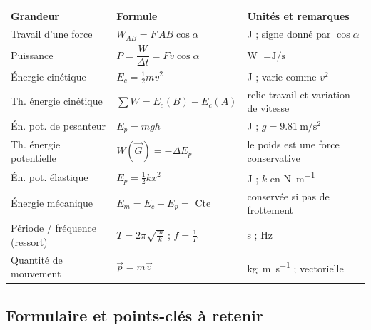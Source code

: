 \documentclass[11pt,a4paper]{article}
\newcommand{\vv}[1]{\vec{#1}}
\begin{document}
\renewcommand{\arraystretch}{1.5}
\begin{center}
\begin{tabular}{>{\raggedright\arraybackslash}m{3.5cm} >{\centering\arraybackslash}m{5.0cm} >{\raggedright\arraybackslash}m{5.2cm}}
\toprule
\rowcolor{primary!15}
\textbf{Grandeur} & \textbf{Formule} & \textbf{Unités et remarques} \\
\midrule
Travail d'une force & $W_{AB}=F\,AB\cos\alpha$ & \si{\joule} ; signe donné par $\cos\alpha$ \\
\rowcolor{black!4}
Puissance & $P=\dfrac{W}{\Delta t}=F v\cos\alpha$ & \si{\watt} $=\si{\joule\per\second}$ \\
Énergie cinétique & $E_c=\tfrac12 m v^2$ & \si{\joule} ; varie comme $v^2$ \\
\rowcolor{black!4}
Th. énergie cinétique & $\sum W=E_c(B)-E_c(A)$ & relie travail et variation de vitesse \\
Én. pot. de pesanteur & $E_p=mgh$ & \si{\joule} ; $g=\SI{9,81}{\metre\per\second\squared}$ \\
\rowcolor{black!4}
Th. énergie potentielle & $W(\vv G)=-\Delta E_p$ & le poids est une force conservative \\
Én. pot. élastique & $E_p=\tfrac12 k x^2$ & \si{\joule} ; $k$ en \si{\newton\per\metre} \\
\rowcolor{black!4}
Énergie mécanique & $E_m=E_c+E_p=$ Cte & conservée si pas de frottement \\
Période / fréquence (ressort) & $T=2\pi\sqrt{\tfrac{m}{k}}$ ; $f=\tfrac1T$ & \si{\second} ; \si{\hertz} \\
\rowcolor{black!4}
Quantité de mouvement & $\vv p=m\vv v$ & \si{\kilogram\metre\per\second} ; vectorielle \\
\bottomrule
\end{tabular}
\end{center}
\renewcommand{\arraystretch}{1}

\subsection{Formulaire et points-clés à retenir}
\end{document}
